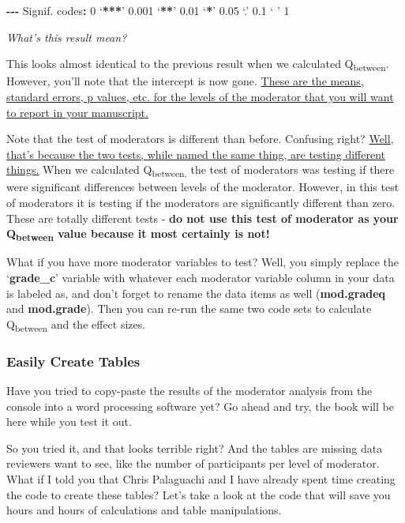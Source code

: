 \documentclass[
]{book}
\newenvironment{Shaded}{\begin{snugshade}}{\end{snugshade}}
\newcommand{\DecValTok}[1]{\textcolor[rgb]{0.00,0.00,0.81}{#1}}
\newcommand{\ErrorTok}[1]{\textcolor[rgb]{0.64,0.00,0.00}{\textbf{#1}}}
\newcommand{\FloatTok}[1]{\textcolor[rgb]{0.00,0.00,0.81}{#1}}
\newcommand{\NormalTok}[1]{#1}
\newcommand{\SpecialCharTok}[1]{\textcolor[rgb]{0.81,0.36,0.00}{\textbf{#1}}}
\begin{document}
\begin{Shaded}
\begin{Highlighting}[]
\SpecialCharTok{{-}{-}{-}}
\NormalTok{Signif. codes}\SpecialCharTok{:}  \DecValTok{0}\NormalTok{ ‘}\SpecialCharTok{**}\ErrorTok{*}\NormalTok{’ }\FloatTok{0.001}\NormalTok{ ‘}\SpecialCharTok{**}\NormalTok{’ }\FloatTok{0.01}\NormalTok{ ‘}\SpecialCharTok{*}\NormalTok{’ }\FloatTok{0.05}\NormalTok{ ‘.’ }\FloatTok{0.1}\NormalTok{ ‘ ’ }\DecValTok{1}
\end{Highlighting}
\end{Shaded}

\emph{What's this result mean?}

This looks almost identical to the previous result when we calculated Q\textsubscript{between}. However, you'll note that the intercept is now gone. \ul{These are the means, standard errors, p values, etc. for the levels of the moderator that you will want to report in your manuscript.}

Note that the test of moderators is different than before. Confusing right? \ul{Well, that's because the two tests, while named the same thing, are testing different things.} When we calculated Q\textsubscript{between,} the test of moderators was testing if there were significant differences between levels of the moderator. However, in this test of moderators it is testing if the moderators are significantly different than zero. These are totally different tests - \textbf{do not use this test of moderator as your Q\textsubscript{between} value because it most certainly is not!}

What if you have more moderator variables to test? Well, you simply replace the `\textbf{grade\_c}' variable with whatever each moderator variable column in your data is labeled as, and don't forget to rename the data items as well (\textbf{mod.gradeq} and \textbf{mod.grade}). Then you can re-run the same two code sets to calculate Q\textsubscript{between} and the effect sizes.

\hypertarget{easily-create-tables-1}{%
\subsubsection{Easily Create Tables}\label{easily-create-tables-1}}

Have you tried to copy-paste the results of the moderator analysis from the console into a word processing software yet? Go ahead and try, the book will be here while you test it out.

So you tried it, and that looks terrible right? And the tables are missing data reviewers want to see, like the number of participants per level of moderator. What if I told you that Chris Palaguachi and I have already spent time creating the code to create these tables? Let's take a look at the code that will save you hours and hours of calculations and table manipulations.
\end{document}
